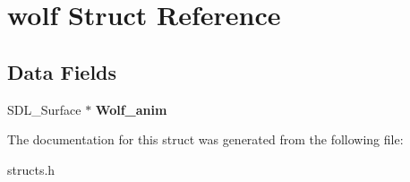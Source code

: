 \hypertarget{structwolf}{}\section{wolf Struct Reference}
\label{structwolf}
\subsection*{Data Fields}
\begin{DoxyCompactItemize}
\item 
\mbox{\label{structwolf_a924b45d6a148377bd8069ef5755e3c53}} 
S\+D\+L\+\_\+\+Surface $\ast$ {\bfseries Wolf\+\_\+anim}
\end{DoxyCompactItemize}


The documentation for this struct was generated from the following file\+:\begin{DoxyCompactItemize}
\item 
structs.\+h\end{DoxyCompactItemize}
